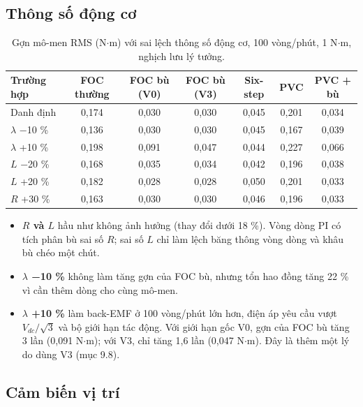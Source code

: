 \subsection{Thông số động cơ}\label{sec:10.3}


\begin{table}[H]
\centering\small
\caption{Gợn mô-men RMS (N$\cdot$m) với sai lệch thông số động cơ, 100 vòng/phút, 1 N$\cdot$m, nghịch lưu lý tưởng.}\label{tab:10.4}
\begin{tabularx}{\linewidth}{@{}>{\raggedright\arraybackslash}Xcccccc@{}}
\toprule
Trường hợp & FOC thường & FOC bù (V0) & FOC bù (V3) & Six-step & PVC & PVC + bù \\ \midrule
Danh định & 0,174 & 0,030 & 0,030 & 0,045 & 0,201 & 0,034 \\
$\lambda$ −10 \% & 0,136 & 0,030 & 0,030 & 0,045 & 0,167 & 0,039 \\
$\lambda$ +10 \% & 0,198 & 0,091 & 0,047 & 0,044 & 0,227 & 0,066 \\
$L$ −20 \% & 0,168 & 0,035 & 0,034 & 0,042 & 0,196 & 0,038 \\
$L$ +20 \% & 0,182 & 0,028 & 0,028 & 0,050 & 0,201 & 0,033 \\
$R$ +30 \% & 0,163 & 0,030 & 0,030 & 0,046 & 0,196 & 0,033 \\
\bottomrule
\end{tabularx}
\end{table}

\begin{itemize}[leftmargin=*]
\item \textbf{$R$ và $L$} hầu như không ảnh hưởng (thay đổi dưới 18 \%). Vòng dòng PI có tích phân bù sai số $R$; sai số $L$ chỉ làm lệch băng thông vòng dòng và khâu bù chéo một chút.
\item \textbf{$\lambda$ −10 \%} không làm tăng gợn của FOC bù, nhưng tổn hao đồng tăng 22 \% vì cần thêm dòng cho cùng mô-men.
\item \textbf{$\lambda$ +10 \%} làm back-EMF ở 100 vòng/phút lớn hơn, điện áp yêu cầu vượt $V_{dc}/\sqrt3$ và bộ giới hạn tác động. Với giới hạn gốc V0, gợn của FOC bù tăng 3 lần (0,091 N$\cdot$m); với V3, chỉ tăng 1,6 lần (0,047 N$\cdot$m). Đây là thêm một lý do dùng V3 (mục 9.8).
\end{itemize}

\subsection{Cảm biến vị trí}\label{sec:10.4}


